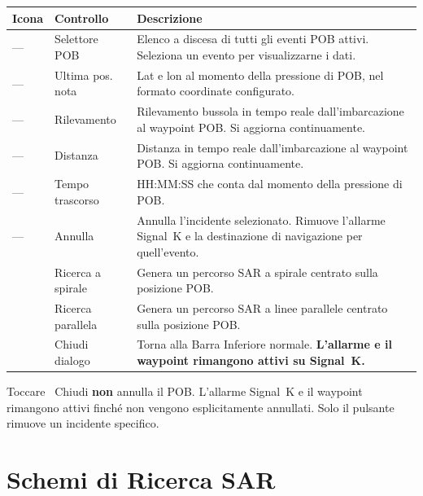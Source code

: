 \begin{longtable}{C{1.4cm}L{3.0cm}L{9.3cm}}
\toprule
{}
\color{white}\sffamily\bfseries Icona &
\color{white}\sffamily\bfseries Controllo &
\color{white}\sffamily\bfseries Descrizione \\
\midrule
---                      & Selettore POB  &
  Elenco a discesa di tutti gli eventi POB attivi.
  Seleziona un evento per visualizzarne i dati. \\
---                      & Ultima pos. nota &
  Lat e lon al momento della pressione di POB, nel formato coordinate configurato. \\
---                      & Rilevamento     &
  Rilevamento bussola in tempo reale dall'imbarcazione al waypoint POB.
  Si aggiorna continuamente. \\
---                      & Distanza        &
  Distanza in tempo reale dall'imbarcazione al waypoint POB. Si aggiorna continuamente. \\
---                      & Tempo trascorso &
  HH:MM:SS che conta dal momento della pressione di POB. \\
---                      & Annulla         &
  Annulla l'incidente selezionato.
  Rimuove l'allarme Signal~K e la destinazione di navigazione per quell'evento. \\
   & Ricerca a spirale &
  Genera un percorso SAR a spirale centrato sulla posizione POB. \\
 & Ricerca parallela &
  Genera un percorso SAR a linee parallele centrato sulla posizione POB. \\
    & Chiudi dialogo  &
  Torna alla Barra Inferiore normale.
  \textbf{L'allarme e il waypoint rimangono attivi su Signal~K.} \\
\bottomrule
\end{longtable}

\begin{warningbox}
Toccare ~Chiudi \textbf{non} annulla il POB.
L'allarme Signal~K e il waypoint rimangono attivi finché non vengono esplicitamente annullati.
Solo il pulsante  rimuove un incidente specifico.
\end{warningbox}

\section{Schemi di Ricerca SAR}

